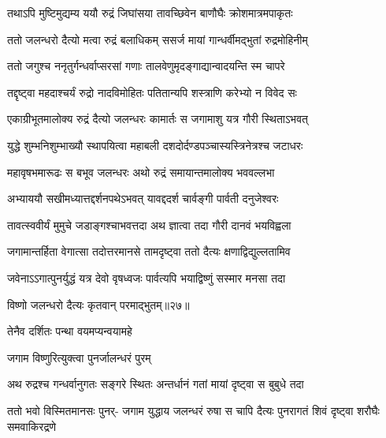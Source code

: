 \twolineshloka
{तथाऽपि मुष्टिमुद्यम्य ययौ रुद्रं जिघांसया}
{तावच्छिवेन बाणौघैः क्रोशमात्रमपाकृतः} %

\twolineshloka
{ततो जलन्धरो दैत्यो मत्वा रुद्रं बलाधिकम्}
{ससर्ज मायां गान्धर्वीमद्भुतां रुद्रमोहिनीम्} %

\twolineshloka
{ततो जगुश्च ननृतुर्गन्धर्वाप्सरसां गणाः}
{तालवेणुमृदङ्गाद्यान्वादयन्ति स्म चापरे} %

\twolineshloka
{तद्दृष्ट्वा महदाश्चर्यं रुद्रो नादविमोहितः}
{पतितान्यपि शस्त्राणि करेभ्यो न विवेद सः} %

\twolineshloka
{एकाग्रीभूतमालोक्य रुद्रं दैत्यो जलन्धरः}
{कामार्तः स जगामाशु यत्र गौरी स्थिताऽभवत्} %

\twolineshloka
{युद्धे शुम्भनिशुम्भाख्यौ स्थापयित्वा महाबली}
{दशदोर्दण्डपञ्चास्यस्त्रिनेत्रश्च जटाधरः} %

\twolineshloka
{महावृषभमारूढः स बभूव जलन्धरः}
{अथो रुद्रं समायान्तमालोक्य भववल्लभा} %

\twolineshloka
{अभ्याययौ सखीमध्यात्तद्दर्शनपथेऽभवत्}
{यावद्ददर्श चार्वङ्गी पार्वती दनुजेश्वरः} %

\twolineshloka
{तावत्स्ववीर्यं मुमुचे जडाङ्गश्चाभवत्तदा}
{अथ ज्ञात्वा तदा गौरी दानवं भयविह्वला} %

\twolineshloka
{जगामान्तर्हिता वेगात्सा तदोत्तरमानसे}
{तामदृष्ट्वा ततो दैत्यः क्षणाद्विद्युल्लतामिव} %

\twolineshloka
{जवेनाऽऽगात्पुनर्युद्धं यत्र देवो वृषध्वजः}
{पार्वत्यपि भयाद्विष्णुं सस्मार मनसा तदा} %




विष्णो जलन्धरो दैत्यः कृतवान् परमाद्भुतम्॥२७॥



\onelineshloka
{तेनैव दर्शितः पन्था वयमप्यन्वयामहे} %




\onelineshloka
{जगाम विष्णुरित्युक्त्वा पुनर्जालन्धरं पुरम्} %

\twolineshloka
{अथ रुद्रश्च गन्धर्वानुगतः सङ्गरे स्थितः}
{अन्तर्धानं गतां मायां दृष्ट्वा स बुबुधे तदा} %

\fourlineindentedshloka
{ततो भवो विस्मितमानसः पुनर्-}
{जगाम युद्धाय जलन्धरं रुषा}
{स चापि दैत्यः पुनरागतं शिवं}
{दृष्ट्वा शरौघैः समवाकिरद्रणे} %


